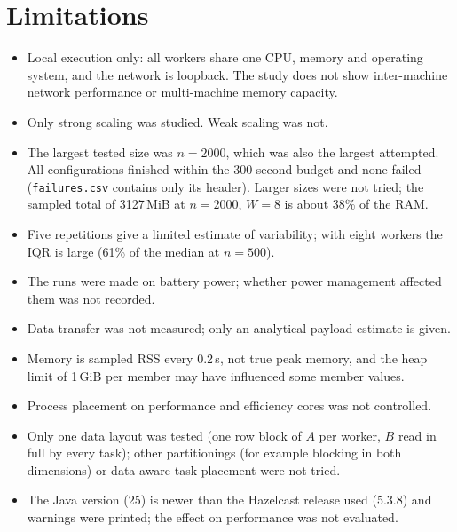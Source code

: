 \documentclass[11pt,a4paper]{article}
\begin{document}
\section{Limitations}
\begin{itemize}
  \item Local execution only: all workers share one CPU, memory and operating system, and the
        network is loopback. The study does not show inter-machine network performance or
        multi-machine memory capacity.
  \item Only strong scaling was studied. Weak scaling was not.
  \item The largest tested size was $n=2000$, which was also the largest attempted. All
        configurations finished within the 300-second budget and none failed
        (\texttt{failures.csv} contains only its header). Larger sizes were not tried; the
        sampled total of 3127\,MiB at $n=2000$, $W=8$ is about 38\% of the RAM.
  \item Five repetitions give a limited estimate of variability; with eight workers the
        IQR is large (61\% of the median at $n=500$).
  \item The runs were made on battery power; whether power management affected them was not
        recorded.
  \item Data transfer was not measured; only an analytical payload estimate is given.
  \item Memory is sampled RSS every 0.2\,s, not true peak memory, and the heap limit of
        1\,GiB per member may have influenced some member values.
  \item Process placement on performance and efficiency cores was not controlled.
  \item Only one data layout was tested (one row block of $A$ per worker, $B$ read in full by
        every task); other partitionings (for example blocking in both dimensions) or
        data-aware task placement were not tried.
  \item The Java version (25) is newer than the Hazelcast release used (5.3.8) and warnings
        were printed; the effect on performance was not evaluated.
\end{itemize}

\end{document}
